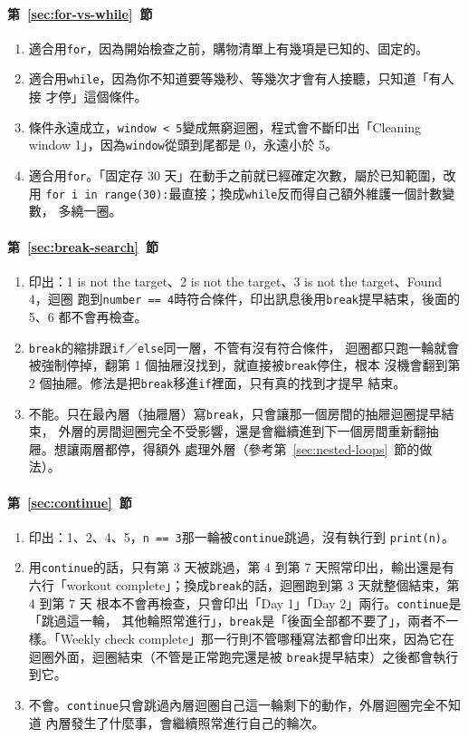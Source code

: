 \paragraph{第~\ref{sec:for-vs-while}~節}
\begin{enumerate}
\item 適合用\texttt{for}，因為開始檢查之前，購物清單上有幾項是已知的、固定的。
\item 適合用\texttt{while}，因為你不知道要等幾秒、等幾次才會有人接聽，只知道「有人接
才停」這個條件。
\item 條件永遠成立，\texttt{window < 5}變成無窮迴圈，程式會不斷印出「Cleaning window
1」，因為\texttt{window}從頭到尾都是 0，永遠小於 5。
\item 適合用\texttt{for}。「固定存 30 天」在動手之前就已經確定次數，屬於已知範圍，改用
\texttt{for i in range(30):}最直接；換成\texttt{while}反而得自己額外維護一個計數變數，
多繞一圈。
\end{enumerate}

\paragraph{第~\ref{sec:break-search}~節}
\begin{enumerate}
\item 印出：1 is not the target、2 is not the target、3 is not the target、Found 4，迴圈
跑到\texttt{number == 4}時符合條件，印出訊息後用\texttt{break}提早結束，後面的 5、6
都不會再檢查。
\item \texttt{break}的縮排跟\texttt{if}／\texttt{else}同一層，不管有沒有符合條件，
迴圈都只跑一輪就會被強制停掉，翻第 1 個抽屜沒找到，就直接被\texttt{break}停住，根本
沒機會翻到第 2 個抽屜。修法是把\texttt{break}移進\texttt{if}裡面，只有真的找到才提早
結束。
\item 不能。只在最內層（抽屜層）寫\texttt{break}，只會讓那一個房間的抽屜迴圈提早結束，
外層的房間迴圈完全不受影響，還是會繼續進到下一個房間重新翻抽屜。想讓兩層都停，得額外
處理外層（參考第~\ref{sec:nested-loops}~節的做法）。
\end{enumerate}

\paragraph{第~\ref{sec:continue}~節}
\begin{enumerate}
\item 印出：1、2、4、5，\texttt{n == 3}那一輪被\texttt{continue}跳過，沒有執行到
\texttt{print(n)}。
\item 用\texttt{continue}的話，只有第 3 天被跳過，第 4 到第 7 天照常印出，輸出還是有
六行「workout complete」；換成\texttt{break}的話，迴圈跑到第 3 天就整個結束，第 4 到第 7 天
根本不會再檢查，只會印出「Day 1」「Day 2」兩行。\texttt{continue}是「跳過這一輪，
其他輪照常進行」，\texttt{break}是「後面全部都不要了」，兩者不一樣。「Weekly check
complete」那一行則不管哪種寫法都會印出來，因為它在迴圈外面，迴圈結束（不管是正常跑完還是被
\texttt{break}提早結束）之後都會執行到它。
\item 不會。\texttt{continue}只會跳過內層迴圈自己這一輪剩下的動作，外層迴圈完全不知道
內層發生了什麼事，會繼續照常進行自己的輪次。
\end{enumerate}


